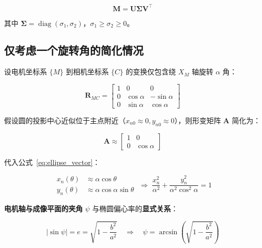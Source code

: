 \documentclass[12pt,a4paper]{article}
\begin{document}
\begin{equation}
\mathbf{M} = \mathbf{U} \boldsymbol{\Sigma} \mathbf{V}^{\top}
\label{eq:svd}
\end{equation}

其中 $\boldsymbol{\Sigma} = \operatorname{diag}(\sigma_1, \sigma_2)$，$\sigma_1 \ge \sigma_2 \ge 0$。

\subsection{仅考虑一个旋转角的简化情况}

设电机坐标系 $\{M\}$ 到相机坐标系 $\{C\}$ 的变换仅包含绕 $X_M$ 轴旋转 $\alpha$ 角：

\begin{equation}
\mathbf{R}_{MC} =
\begin{bmatrix}
1 & 0 & 0 \\
0 & \cos\alpha & -\sin\alpha \\
0 & \sin\alpha & \cos\alpha
\end{bmatrix}
\label{eq:simple_rotation}
\end{equation}

假设圆的投影中心近似位于主点附近（$x_{n0} \approx 0, y_{n0} \approx 0$），则形变矩阵 $\mathbf{A}$ 简化为：

\begin{equation}
\mathbf{A} \approx
\begin{bmatrix}
1 & 0 \\
0 & \cos\alpha
\end{bmatrix}
\label{eq:simple_deformation}
\end{equation}

代入公式~\eqref{eq:ellipse_vector}：

\begin{equation}
\begin{aligned}
x_n(\theta) &\approx \alpha \cos\theta \\[4pt]
y_n(\theta) &\approx \alpha \cos\alpha \sin\theta
\end{aligned}
\;\Longrightarrow\;
\frac{x_n^2}{\alpha^2} + \frac{y_n^2}{\alpha^2 \cos^2\alpha} = 1
\label{eq:ellipse_equation}
\end{equation}

\textbf{电机轴与成像平面的夹角} $\psi$ 与椭圆偏心率的\textbf{显式关系}：

\begin{equation}
\boxed{
|\sin\psi| = e = \sqrt{1 - \frac{b^2}{a^2}}
\quad\Longrightarrow\quad
\psi = \arcsin\!\left(\sqrt{1 - \frac{b^2}{a^2}}\right)
}
\label{eq:angle_eccentricity}
\end{equation}
\end{document}
